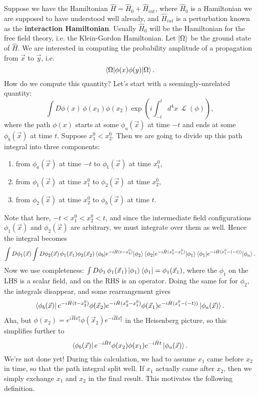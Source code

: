 \documentclass{report}
\theoremstyle{plain}
\theoremstyle{definition}
\theoremstyle{remark}
\DeclareMathOperator{\cL}{\mathcal{L}}
\begin{document}
Suppose we have the Hamiltonian $\hat{H} = \hat{H}_0 + \hat{H}_{int}$,
where $\hat{H}_0$ is a Hamiltonian we are supposed to have understood
well already, and $\hat{H}_{int}$ is a perturbation known as the {\bf
  interaction Hamiltonian}. Usually $\hat{H}_0$ will be the
Hamiltonian for the free field theory, i.e. the Klein-Gordon
Hamiltonian. Let $\ket{\Omega}$ be the ground state of $\hat{H}$. We
are interested in computing the probability amplitude of a propagation
from $\vec{x}$ to $\vec{y}$, i.e.
$$ \braket{\Omega| \phi(x) \phi(y) | \Omega}. $$
How do we compute this quantity? Let's start with a
seemingly-unrelated quantity:
$$ \int D\phi(x) \, \phi(x_1) \phi(x_2) \exp\left(i \int_{-t}^t d^4x \, \cL(\phi)\right), $$
where the path $\phi(x)$ starts at some $\phi_a(\vec{x})$ at time $-t$
and ends at some $\phi_b(\vec{x})$ at time $t$. Suppose
$x_1^0 < x_2^0$. Then we are going to divide up this path integral
into three components:
\begin{enumerate}
\item from $\phi_a(\vec{x})$ at time $-t$ to $\phi_1(\vec{x})$ at time $x_1^0$, 
\item from $\phi_1(\vec{x})$ at time $x_1^0$ to $\phi_2(\vec{x})$ at time $x_2^0$,
\item from $\phi_2(\vec{x})$ at time $x_2^0$ to $\phi_b(\vec{x})$ at time $t$.
\end{enumerate}
Note that here, $-t < x_1^0 < x_2^0 < t$, and since the intermediate
field configurations $\phi_1(\vec{x})$ and $\phi_2(\vec{x})$ are
arbitrary, we must integrate over them as well. Hence the integral
becomes
$$ \int D\phi_1(\vec{x}) \int D\phi_2(\vec{x}) \, \phi_1(\vec{x}_1) \phi_2(\vec{x}_2) \braket{\phi_b | e^{-i\hat{H}(t - x_2^0)} | \phi_2}\braket{\phi_2 | e^{-i\hat{H}(x_2^0 - x_1^0)} | \phi_1}\braket{\phi_1 | e^{-i\hat{H}(x_1^0 - (-t))} | \phi_a}. $$
Now we use completeness:
$\int D\phi_1 \, \phi_1(\vec{x}_1) \ket{\phi_1}\bra{\phi_1} =
\phi_1(\vec{x}_1)$,
where the $\phi_1$ on the LHS is a scalar field, and on the RHS is an
operator. Doing the same for for $\phi_2$, the integrals disappear,
and some rearrangement gives
\begin{align} \bra{\phi_b(\vec{x})} e^{-i\hat{H}(t - x_2^0)} \phi(\vec{x}_2)
    e^{-i\hat{H}(x_2^0 - x_1^0)} \phi(\vec{x}_1) e^{-i\hat{H}(x_1^0 -
(-t))} \ket{\phi_a(\vec{x})}.\label{tricky}
\end{align}
Aha, but
$\phi(x_2) = e^{i\hat{H}x_2^0}\phi(\vec{x}_2)e^{-i\hat{H}x_2^0}$ in
the Heisenberg picture, so this simplifies further to
$$ \bra{\phi_b(\vec{x})} e^{-i\hat{H}t} \phi(x_2)\phi(x_1) e^{-i\hat{H}t} \ket{\phi_a(\vec{x})}. $$
We're not done yet! During this calculation, we had to assume $x_1$
came before $x_2$ in time, so that the path integral split well. If
$x_1$ actually came after $x_2$, then we simply exchange $x_1$ and
$x_2$ in the final result. This motivates the following definition.
\end{document}
